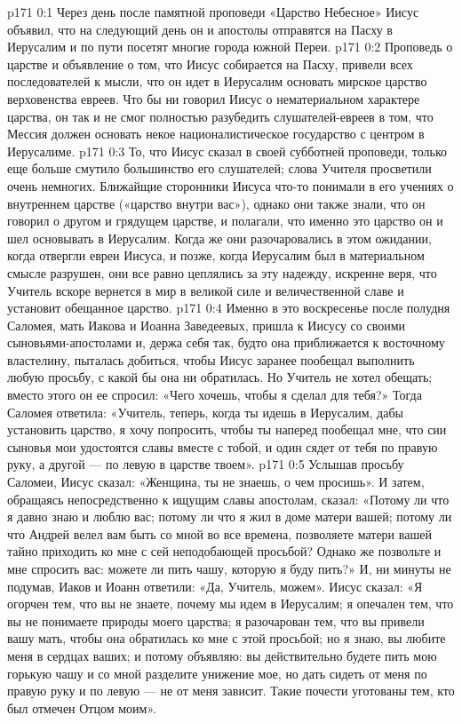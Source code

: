 \author{Комиссия срединников}
\vs p171 0:1 Через день после памятной проповеди «Царство Небесное» Иисус объявил, что на следующий день он и апостолы отправятся на Пасху в Иерусалим и по пути посетят многие города южной Переи.
\vs p171 0:2 Проповедь о царстве и объявление о том, что Иисус собирается на Пасху, привели всех последователей к мысли, что он идет в Иерусалим основать мирское царство верховенства евреев. Что бы ни говорил Иисус о нематериальном характере царства, он так и не смог полностью разубедить слушателей\hyp{}евреев в том, что Мессия должен основать некое националистическое государство с центром в Иерусалиме.
\vs p171 0:3 То, что Иисус сказал в своей субботней проповеди, только еще больше смутило большинство его слушателей; слова Учителя просветили очень немногих. Ближайщие сторонники Иисуса что\hyp{}то понимали в его учениях о внутреннем царстве («царство внутри вас»), однако они также знали, что он говорил о другом и грядущем царстве, и полагали, что именно это царство он и шел основывать в Иерусалим. Когда же они разочаровались в этом ожидании, когда отвергли евреи Иисуса, и позже, когда Иерусалим был в материальном смысле разрушен, они все равно цеплялись за эту надежду, искренне веря, что Учитель вскоре вернется в мир в великой силе и величественной славе и установит обещанное царство.
\vs p171 0:4 \pc Именно в это воскресенье после полудня Саломея, мать Иакова и Иоанна Заведеевых, пришла к Иисусу со своими сыновьями\hyp{}апостолами и, держа себя так, будто она приближается к восточному властелину, пыталась добиться, чтобы Иисус заранее пообещал выполнить любую просьбу, с какой бы она ни обратилась. Но Учитель не хотел обещать; вместо этого он ее спросил: «Чего хочешь, чтобы я сделал для тебя?» Тогда Саломея ответила: «Учитель, теперь, когда ты идешь в Иерусалим, дабы установить царство, я хочу попросить, чтобы ты наперед пообещал мне, что сии сыновья мои удостоятся славы вместе с тобой, и один сядет от тебя по правую руку, а другой --- по левую в царстве твоем».
\vs p171 0:5 Услышав просьбу Саломеи, Иисус сказал: «Женщина, ты не знаешь, о чем просишь». И затем, обращаясь непосредственно к ищущим славы апостолам, сказал: «Потому ли что я давно знаю и люблю вас; потому ли что я жил в доме матери вашей; потому ли что Андрей велел вам быть со мной во все времена, позволяете матери вашей тайно приходить ко мне с сей неподобающей просьбой? Однако же позвольте и мне спросить вас: можете ли пить чашу, которую я буду пить?» И, ни минуты не подумав, Иаков и Иоанн ответили: «Да, Учитель, можем». Иисус сказал: «Я огорчен тем, что вы не знаете, почему мы идем в Иерусалим; я опечален тем, что вы не понимаете природы моего царства; я разочарован тем, что вы привели вашу мать, чтобы она обратилась ко мне с этой просьбой; но я знаю, вы любите меня в сердцах ваших; и потому объявляю: вы действительно будете пить мою горькую чашу и со мной разделите унижение мое, но дать сидеть от меня по правую руку и по левую --- не от меня зависит. Такие почести уготованы тем, кто был отмечен Отцом моим».
